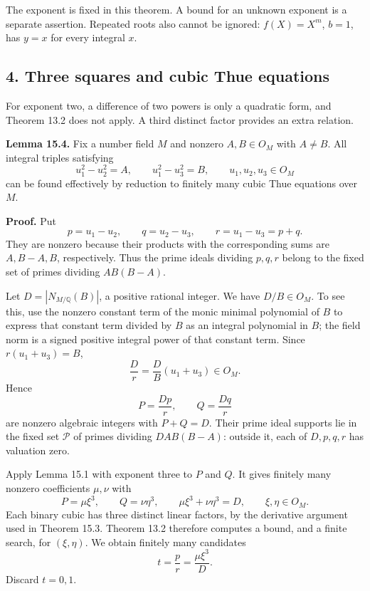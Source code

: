 \documentclass[
  11pt,
  a4paper,
]{article}
\begin{document}
The exponent is fixed in this theorem. A bound for an unknown exponent
is a separate assertion. Repeated roots also cannot be ignored:
\(f(X)=X^m\), \(b=1\), has \(y=x\) for every integral \(x\).

\subsection{4. Three squares and cubic Thue
equations}\label{three-squares-and-cubic-thue-equations}

For exponent two, a difference of two powers is only a quadratic form,
and Theorem 13.2 does not apply. A third distinct factor provides an
extra relation.

\textbf{Lemma 15.4.} Fix a number field \(M\) and nonzero \(A,B\in O_M\)
with \(A\ne B\). All integral triples satisfying \[
u_1^2-u_2^2=A,\qquad u_1^2-u_3^2=B,
\qquad u_1,u_2,u_3\in O_M
\tag{15.21}
\] can be found effectively by reduction to finitely many cubic Thue
equations over \(M\).

\textbf{Proof.} Put \[
p=u_1-u_2,\qquad q=u_2-u_3,\qquad r=u_1-u_3=p+q.
\tag{15.22}
\] They are nonzero because their products with the corresponding sums
are \(A,B-A,B\), respectively. Thus the prime ideals dividing \(p,q,r\)
belong to the fixed set of primes dividing \(AB(B-A)\).

Let \(D=|N_{M/\mathbb Q}(B)|\), a positive rational integer. We have
\(D/B\in O_M\). To see this, use the nonzero constant term of the monic
minimal polynomial of \(B\) to express that constant term divided by
\(B\) as an integral polynomial in \(B\); the field norm is a signed
positive integral power of that constant term. Since \(r(u_1+u_3)=B\),
\[
\frac Dr=\frac DB(u_1+u_3)\in O_M.
\tag{15.23}
\] Hence \[
P=\frac{Dp}{r},\qquad Q=\frac{Dq}{r}
\tag{15.24}
\] are nonzero algebraic integers with \(P+Q=D\). Their prime ideal
supports lie in the fixed set \(\mathcal P\) of primes dividing
\(DAB(B-A)\): outside it, each of \(D,p,q,r\) has valuation zero.

Apply Lemma 15.1 with exponent three to \(P\) and \(Q\). It gives
finitely many nonzero coefficients \(\mu,\nu\) with \[
P=\mu\xi^3,\qquad Q=\nu\eta^3,\qquad
\mu\xi^3+\nu\eta^3=D,\qquad \xi,\eta\in O_M.
\tag{15.25}
\] Each binary cubic has three distinct linear factors, by the
derivative argument used in Theorem 15.3. Theorem 13.2 therefore
computes a bound, and a finite search, for \((\xi,\eta)\). We obtain
finitely many candidates \[
t=\frac p r=\frac{\mu\xi^3}{D}.
\tag{15.26}
\] Discard \(t=0,1\).
\end{document}
